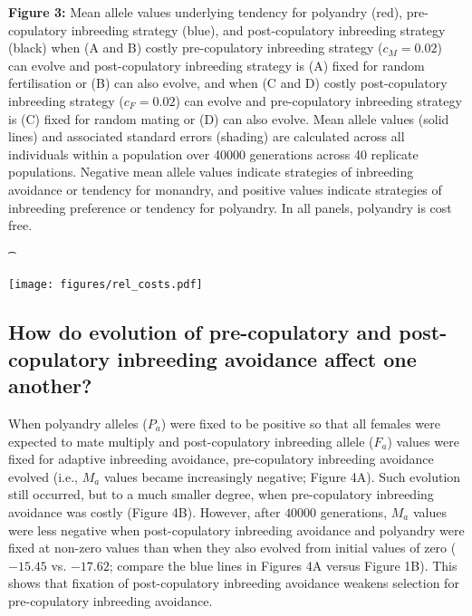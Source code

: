 \documentclass[10pt,letterpaper]{article}
\begin{document}
{\color{Gray}
\begin{adjustwidth}{-2.2in}{0in}
{%
   \begin{justify}\vspace{0.25 mm} \textbf{Figure 3:} Mean allele values underlying tendency for polyandry (red), pre-copulatory inbreeding strategy (blue), and post-copulatory inbreeding strategy (black) when (A and B) costly pre-copulatory inbreeding strategy ($c_{M} = 0.02$) can evolve and post-copulatory inbreeding strategy is (A) fixed for random fertilisation or (B) can also evolve, and when (C and D) costly post-copulatory inbreeding strategy ($c_{F} = 0.02$) can evolve and pre-copulatory inbreeding strategy is (C) fixed for random mating or (D) can also evolve. Mean allele values (solid lines) and associated standard errors (shading) are calculated across all individuals within a population over 40000 generations across 40 replicate populations. Negative mean allele values indicate strategies of inbreeding avoidance or tendency for monandry, and positive values indicate strategies of inbreeding preference or tendency for polyandry. In all panels, polyandry is cost free. \end{justify}{\t}%
}
{%
   \texttt{[image: figures/rel\_costs.pdf]}%
}%
\end{adjustwidth}
}

\subsection*{How do evolution of pre-copulatory and post-copulatory inbreeding avoidance affect one another?}

When polyandry alleles ($P_{a}$) were fixed to be positive so that all females were expected to mate multiply and post-copulatory inbreeding allele ($F_{a}$) values were fixed for adaptive inbreeding avoidance, pre-copulatory inbreeding avoidance evolved (i.e., $M_{a}$ values became increasingly negative; Figure 4A). Such evolution still occurred, but to a much smaller degree, when pre-copulatory inbreeding avoidance was costly (Figure 4B). However, after $40000$ generations, $M_{a}$ values were less negative when post-copulatory inbreeding avoidance and polyandry were fixed at non-zero values than when they also evolved from initial values of zero ($-15.45$ vs. $-17.62$; compare the blue lines in Figures 4A versus Figure 1B). This shows that fixation of post-copulatory inbreeding avoidance weakens selection for pre-copulatory inbreeding avoidance.
\end{document}
